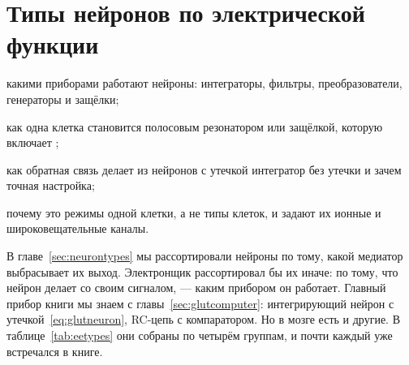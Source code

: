 \chapter{Типы нейронов по электрической функции}
\label{sec:eetypes}
\begin{chaptergoals}
\item какими приборами работают нейроны: интеграторы, фильтры, преобразователи, генераторы и защёлки;
\item как одна клетка становится полосовым резонатором или защёлкой, которую включает ;
\item как обратная связь делает из нейронов с утечкой интегратор без утечки и зачем точная настройка;
\item почему это режимы одной клетки, а не типы клеток, и задают их ионные и широковещательные каналы.
\end{chaptergoals}

В главе~\ref{sec:neurontypes} мы рассортировали нейроны по тому, какой медиатор выбрасывает их выход. Электронщик рассортировал бы их иначе: по тому, что нейрон делает со своим сигналом, --- каким прибором он работает. Главный прибор книги мы знаем с главы~\ref{sec:glutcomputer}: интегрирующий нейрон с утечкой~\eqref{eq:glutneuron}, RC-цепь с компаратором. Но в мозге есть и другие. В таблице~\ref{tab:eetypes} они собраны по четырём группам, и почти каждый уже встречался в книге.

